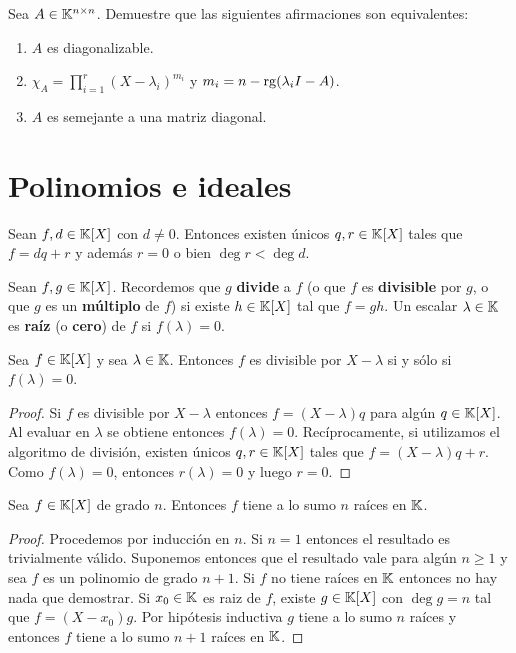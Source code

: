 \begin{xca}
	\label{xca:matriz_diagonalizable}
	Sea $A\in\mathbb{K}^{n\times n}$. Demuestre que las siguientes afirmaciones son equivalentes:
	\begin{enumerate}
		\item $A$ es diagonalizable.
		\item $\chi_A=\prod_{i=1}^r(X-\lambda_i)^{m_i}$ y $m_i=n-\operatorname{rg}(\lambda_iI-A)$. 
		\item $A$ es semejante a una matriz diagonal.
	\end{enumerate}
\end{xca}

\section{Polinomios e ideales}

\begin{thm}
	Sean $f,d\in\mathbb{K}[X]$ con $d\ne0$. Entonces existen únicos $q,r\in\mathbb{K}[X]$ tales
	que $f=dq+r$ y además $r=0$ o bien $\deg r<\deg d$. 
%
\end{thm}

\begin{block}
	Sean $f,g\in\mathbb{K}[X]$. Recordemos que $g$ \textbf{divide} a $f$ (o que $f$ es
	\textbf{divisible} por $g$, o que $g$ es un \textbf{múltiplo} de $f$) si
	existe $h\in\mathbb{K}[X]$ tal que $f=gh$. Un escalar $\lambda\in\mathbb{K}$ es
	\textbf{raíz} (o \textbf{cero}) de $f$ si $f(\lambda)=0$. 
\end{block}

\begin{cor}
	Sea $f\in\mathbb{K}[X]$ y sea $\lambda\in\mathbb{K}$. Entonces $f$ es divisible por
	$X-\lambda$ si y sólo si $f(\lambda)=0$.

	\begin{proof}
		Si $f$ es divisible por $X-\lambda$ entonces $f=(X-\lambda)q$ para
		algún $q\in\mathbb{K}[X]$. Al evaluar en $\lambda$ se obtiene entonces
		$f(\lambda)=0$. Recíprocamente, si utilizamos el algoritmo de división,
		existen únicos $q,r\in\mathbb{K}[X]$ tales que $f=(X-\lambda)q+r$. Como
		$f(\lambda)=0$, entonces $r(\lambda)=0$ y luego $r=0$. 
	\end{proof}
\end{cor}

\begin{cor}
	Sea $f\in\mathbb{K}[X]$ de grado $n$. Entonces $f$ tiene a lo sumo $n$ raíces en
	$\mathbb{K}$.

	\begin{proof}
		Procedemos por inducción en $n$. Si $n=1$ entonces el resultado es
		trivialmente válido. Suponemos entonces que el resultado vale para
		algún $n\geq1$ y sea $f$ es un polinomio de grado $n+1$. Si $f$ no
		tiene raíces en $\mathbb{K}$ entonces no hay nada que demostrar.  Si
		$x_0\in\mathbb{K}$ es raiz de $f$, existe $g\in\mathbb{K}[X]$ con $\deg g=n$ tal
		que $f=(X-x_0)g$. Por hipótesis inductiva $g$ tiene a lo sumo $n$
		raíces y entonces $f$ tiene a lo sumo $n+1$ raíces en $\mathbb{K}$. 
	\end{proof}
\end{cor}

